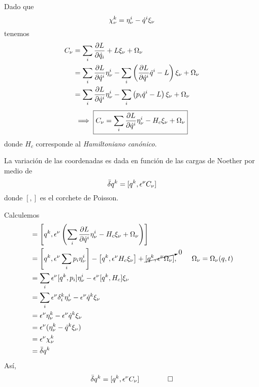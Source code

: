 Dado que
\begin{equation}
  \chi^k_\nu =\eta^{i}_\nu -\dot{q}^{i} \xi_\nu 
\end{equation}
tenemos
\begin{align}
  C_\nu &=\sum_i\pdv{L}{\dot{q}_i} (\eta^{i}_\nu -\dot{q}^{i} \xi_\nu ) +L \xi_\nu +\Omega_\nu \\
  &=\sum_i\pdv{L}{\dot{q}^{i}}\eta^{i}_\nu -\sum_i\left(\pdv{L}{\dot{q}^{i}}\dot{q}^{i}-L\right)\xi_\nu +\Omega_\nu \\
  &=\sum_i\pdv{L}{\dot{q}^{i}}\eta^{i}_\nu -\sum_i\left(p_i\dot{q}^{i}-L\right)\xi_\nu +\Omega_\nu 
\end{align}
\begin{equation}
  \implies \boxed{C_\nu =\sum_i\pdv{L}{\dot{q}^{i}}\eta^{i}_\nu -H_c\xi_\nu +\Omega_\nu }
\end{equation}
donde $H_c$ corresponde al \textit{Hamiltoniano canónico}.

\begin{teor}
	La variación de las coordenadas es dada en función de las cargas de Noether por medio de 
	\begin{equation}
  \bar{\delta} q^k=[q^k,\epsilon^\nu C_\nu ]
\end{equation}
donde $[,]$ es el corchete de Poisson.
\end{teor}

\begin{prueba}
	Calculemos
	\begin{align}
  [q^k,\epsilon^\n C_\n ]&=\left[q^k,\epsilon^\n \left(\sum_i\pdv{L}{\qd^{i}}\eta^{i}_\n -H_c\xi_\n +\Omega_\n \right)\right]\\
  &=\left[q^k,\epsilon^\n \sum_ip_i\eta^{i}_\n \right]-\left[q^k,\epsilon ^\n H_c\xi_\n \right]+\cancelto{0}{[q^k,\epsilon^\n \Omega_\n ]},\qquad \Omega_\n =\Omega_\n (q,t)\\
  &=\sum_i\epsilon^\n [q^k,p_i]\eta^{i}_\n -\epsilon^\n [q^k,H_c]\xi_\n \\
  &=\sum_i\epsilon^\n \delta^k_i\eta^{i}_\n -\epsilon^\n \qd^k\xi_\n \\
  &=\epsilon^\n \eta^k_\n -\epsilon^\n \qd^k\xi_\n \\
  &=\epsilon^\n( \eta^k_\n - \qd^k\xi_\n )\\
  &=\epsilon^\n \chi^k_\n \\
  &=\db q^k
\end{align}
Así,
\begin{equation}
  \bar{\delta} q^k=[q^k,\epsilon^\nu C_\nu ]\qquad \qed
\end{equation}
\end{prueba}


